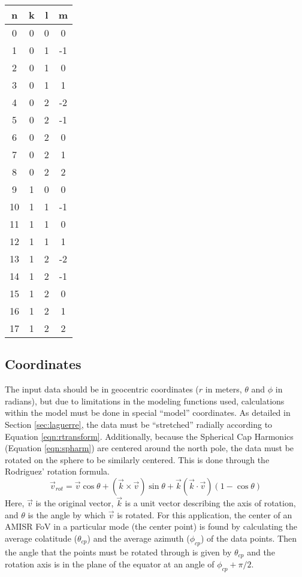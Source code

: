 \documentclass[12pt,letterpaper]{article}
\begin{document}
  \begin{center}
    \begin{tabular}{c c c c}
      n & k & l & m \\
      \hline
      0 & 0 & 0 & 0 \\
      1 & 0 & 1 & -1 \\
      2 & 0 & 1 & 0 \\
      3 & 0 & 1 & 1 \\
      4 & 0 & 2 & -2 \\
      5 & 0 & 2 & -1 \\
      6 & 0 & 2 & 0 \\
      7 & 0 & 2 & 1 \\
      8 & 0 & 2 & 2 \\
      9 & 1 & 0 & 0 \\
      10 & 1 & 1 & -1 \\
      11 & 1 & 1 & 0 \\
      12 & 1 & 1 & 1 \\
      13 & 1 & 2 & -2 \\
      14 & 1 & 2 & -1 \\
      15 & 1 & 2 & 0 \\
      16 & 1 & 2 & 1 \\
      17 & 1 & 2 & 2 \\
    \end{tabular}
  \end{center}

  \subsection{Coordinates}
  The input data should be in geocentric coordinates (\(r\) in meters, \(\theta\) and \(\phi\) in radians), but due to limitations in the modeling functions used, calculations within the model must be done in special ``model'' coordinates.  As detailed in Section \ref{sec:laguerre}, the data must be ``stretched'' radially according to Equation \ref{eqn:rtransform}.  Additionally, because the Spherical Cap Harmonics (Equation \ref{eqn:spharm}) are centered around the north pole, the data must be rotated on the sphere to be similarly centered.  This is done through the Rodriguez' rotation formula.
  \begin{equation}
    \vec{v}_{rot} = \vec{v}\cos\theta + (\vec{k}\times\vec{v})\sin\theta + \vec{k}(\vec{k}\cdot\vec{v})(1-\cos\theta)
  \end{equation}
  Here, \(\vec{v}\) is the original vector, \(\vec{k}\) is a unit vector describing the axis of rotation, and \(\theta\) is the angle by which \(\vec{v}\) is rotated.  For this application, the center of an AMISR FoV in a particular mode (the center point) is found by calculating the average colatitude (\(\theta_{cp}\)) and the average azimuth (\(\phi_{cp}\)) of the data points.  Then the angle that the points must be rotated through is given by \(\theta_{cp}\) and the rotation axis is in the plane of the equator at an angle of \(\phi_{cp}+\pi/2\).
\end{document}

